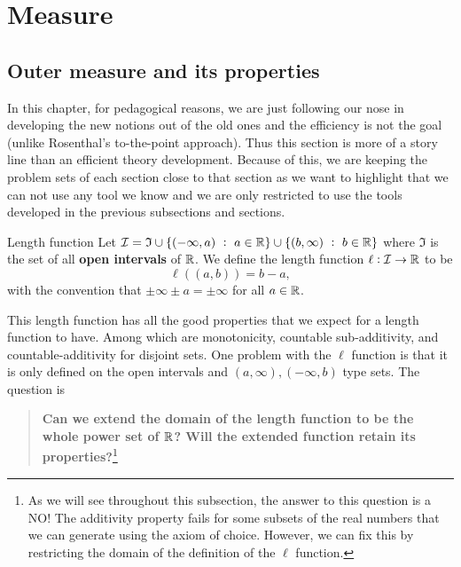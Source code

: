 \chapter{Measure}

\section{Outer measure and its properties}
In this chapter, for pedagogical reasons, we are just following our nose in developing the new notions out of the old ones and the efficiency is not the goal (unlike Rosenthal's to-the-point approach). Thus this section is more of a story line than an efficient theory development. Because of this, we are keeping the problem sets of each section close to that section as we want to highlight that we can not use any tool we know and we are only restricted to use the tools developed in the previous subsections and sections.

\begin{definition}{Length function}
	Let $ \mathcal{I} = \mathfrak{I} \cup \set{(-\infty,a)\ :\ a \in \R} \cup \set{(b,\infty)\ :\ b \in \R}  $ where $ \mathfrak{I} $ is the set of all \textbf{open intervals} of $ \mathbb{R} $. We define the length function $ \ell: \mathcal{I} \to \mathbb{R} $ to be 
	\[ \ell((a,b)) = b - a, \]
	with the convention that $ \pm\infty \pm a = \pm \infty $ for all $ a\in \mathbb{R} $.
\end{definition}
This length function has all the good properties that we expect for a length function to have. Among which are monotonicity, countable sub-additivity, and countable-additivity for disjoint sets. One problem with the $ \ell $ function is that it is only defined on the open intervals and $ (a,\infty),(-\infty,b) $ type sets. The question is 
\begin{quote}
	\textbf{Can we extend the domain of the length function to be the whole power set of $ \mathbb{R} $? Will the extended function retain its properties?}\footnote{As we will see throughout this subsection, the answer to this question is a NO! The additivity property fails for some subsets of the real numbers that we can generate using the axiom of choice. However, we can fix this by restricting the domain of the definition of the $ \ell $ function.} 
\end{quote}


